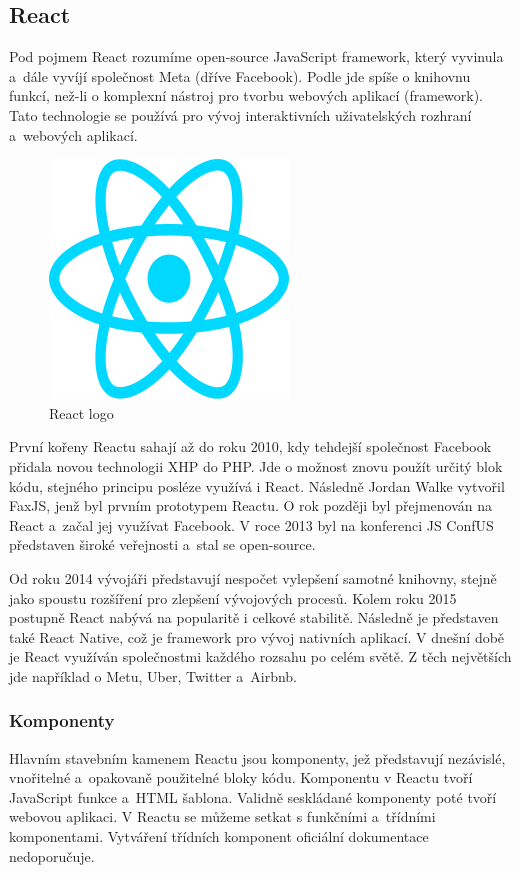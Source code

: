 \subsection{React}

Pod pojmem React rozumíme open-source JavaScript framework, který vyvinula a~dále vyvíjí společnost Meta (dříve Facebook). 
Podle \cite{reactbanks} jde spíše o knihovnu funkcí, než-li o komplexní nástroj pro tvorbu webových aplikací (framework). 
Tato technologie se používá pro vývoj interaktivních uživatelských rozhraní a~webových aplikací.\cite{reacthubspot}

\begin{figure}[htb]
	\centering
		\includegraphics[width=.3\textwidth]{images/react-logo.png}
	\caption[React logo]{React logo \cite{react}}
	\label{fig:reactlogo}
\end{figure}

První kořeny Reactu sahají až do roku 2010, kdy tehdejší společnost Facebook přidala novou technologii XHP do PHP. 
Jde o možnost znovu použít určitý blok kódu, stejného principu posléze využívá i React. Následně Jordan Walke vytvořil FaxJS, jenž byl prvním prototypem Reactu.
O rok později byl přejmenován na React a~začal jej využívat Facebook. 
V roce 2013 byl na konferenci JS ConfUS představen široké veřejnosti a~stal se open-source.

Od roku 2014 vývojáři představují nespočet vylepšení samotné knihovny, stejně jako spoustu rozšíření pro zlepšení vývojových procesů. 
Kolem roku 2015 postupně React nabývá na popularitě i celkové stabilitě. Následně je představen také React Native, což je framework pro vývoj nativních aplikací.
V dnešní době je React využíván společnostmi každého rozsahu po celém světě. 
Z těch největších jde například o Metu, Uber, Twitter a~Airbnb.\cite{reactbanks,reactrisingstack}

\subsubsection{Komponenty}

Hlavním stavebním kamenem Reactu jsou komponenty, jež představují nezávislé, vnořitelné a~opakovaně použitelné bloky kódu. 
Komponentu v Reactu tvoří JavaScript funkce a~HTML šablona. Validně seskládané komponenty poté tvoří webovou aplikaci.
V Reactu se můžeme setkat s funkčními a~třídními komponentami. Vytváření třídních komponent oficiální dokumentace nedoporučuje.

